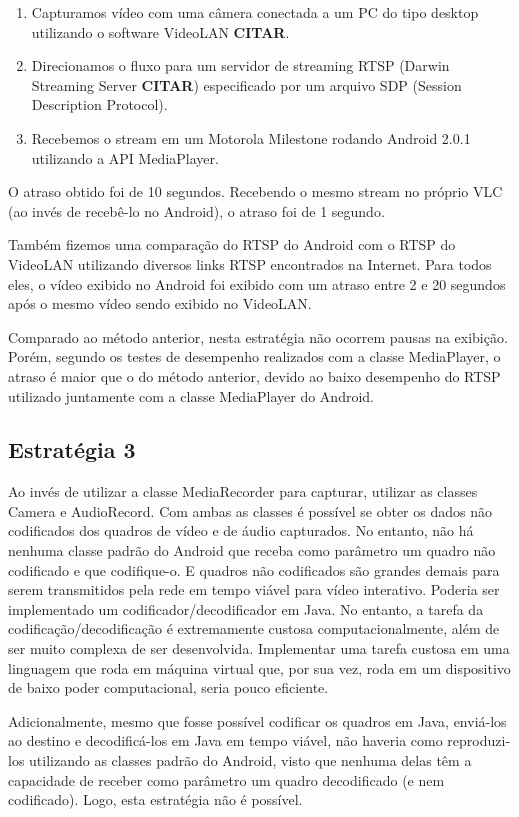\documentclass{acm_proc_article-sp}
\newcommand{\todo}[1]{\textcolor[rgb]{1.00,0.00,0.00}{\bf \uppercase{#1}}}
\begin{document}
\begin{enumerate}
 \item Capturamos vídeo com uma câmera conectada a um PC do tipo desktop utilizando o software VideoLAN \todo{citar}.
 \item Direcionamos o fluxo para um servidor de streaming RTSP (Darwin Streaming Server \todo{citar}) especificado por um arquivo SDP (Session Description Protocol).
 \item Recebemos o stream em um Motorola Milestone rodando Android 2.0.1 utilizando a API MediaPlayer.
\end{enumerate}

O atraso obtido foi de 10 segundos. Recebendo o mesmo stream no próprio VLC (ao invés de recebê-lo no Android), o atraso foi de 1 segundo.	 	 	

Também fizemos uma comparação do RTSP do Android com o RTSP do VideoLAN utilizando diversos links RTSP encontrados na Internet. Para todos eles, o vídeo exibido no Android foi exibido com um atraso entre 2 e 20 segundos após o mesmo vídeo sendo exibido no VideoLAN.

Comparado ao método anterior, nesta estratégia não ocorrem pausas na exibição. Porém, segundo os testes de desempenho realizados com a classe MediaPlayer, o atraso é maior que o do método anterior, devido ao baixo desempenho do RTSP utilizado juntamente com a classe MediaPlayer do Android.

\subsection{Estratégia 3}

Ao invés de utilizar a classe MediaRecorder para capturar, utilizar as classes Camera e AudioRecord. Com ambas as classes é possível se obter os dados não codificados dos quadros de vídeo e de áudio capturados. No entanto, não há nenhuma classe padrão do Android que receba como parâmetro um quadro não codificado e que codifique-o. E quadros não codificados são grandes demais para serem transmitidos pela rede em tempo viável para vídeo interativo. Poderia ser implementado um codificador/decodificador em Java. No entanto, a tarefa da codificação/decodificação é extremamente custosa computacionalmente, além de ser muito complexa de ser desenvolvida. Implementar uma tarefa custosa em uma linguagem que roda em máquina virtual que, por sua vez, roda em um dispositivo de baixo poder computacional, seria pouco eficiente.

Adicionalmente, mesmo que fosse possível codificar os quadros em Java, enviá-los ao destino e decodificá-los em Java em tempo viável, não haveria como reproduzi-los utilizando as classes padrão do Android, visto que nenhuma delas têm a capacidade de receber como parâmetro um quadro decodificado (e nem codificado). Logo, esta estratégia não é possível.
\end{document}
